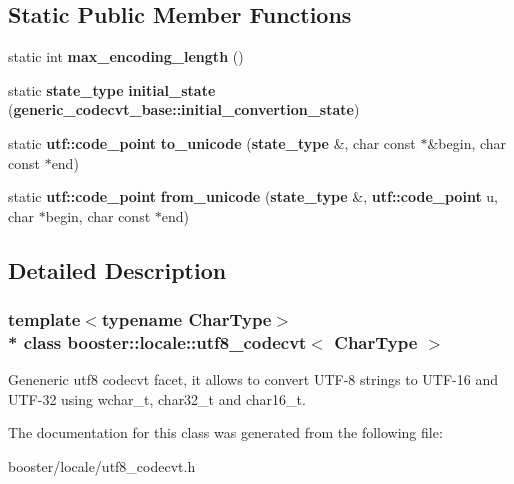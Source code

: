 \subsection*{Static Public Member Functions}
\begin{DoxyCompactItemize}
\item 
static int {\bfseries max\+\_\+encoding\+\_\+length} ()\label{classbooster_1_1locale_1_1utf8__codecvt_a4476be501469ebfecd9786b643e0598b}

\item 
static {\bf state\+\_\+type} {\bfseries initial\+\_\+state} ({\bf generic\+\_\+codecvt\+\_\+base\+::initial\+\_\+convertion\+\_\+state})\label{classbooster_1_1locale_1_1utf8__codecvt_a0a0ced9a5b661c48e8a0471a85596f59}

\item 
static {\bf utf\+::code\+\_\+point} {\bfseries to\+\_\+unicode} ({\bf state\+\_\+type} \&, char const $\ast$\&begin, char const $\ast$end)\label{classbooster_1_1locale_1_1utf8__codecvt_a7843e304f79a5d56a43fbdf05b720d8e}

\item 
static {\bf utf\+::code\+\_\+point} {\bfseries from\+\_\+unicode} ({\bf state\+\_\+type} \&, {\bf utf\+::code\+\_\+point} u, char $\ast$begin, char const $\ast$end)\label{classbooster_1_1locale_1_1utf8__codecvt_adf90e67eeef5be07bea87c6ad46d5559}

\end{DoxyCompactItemize}


\subsection{Detailed Description}
\subsubsection*{template$<$typename Char\+Type$>$\\*
class booster\+::locale\+::utf8\+\_\+codecvt$<$ Char\+Type $>$}

Geneneric utf8 codecvt facet, it allows to convert U\+T\+F-\/8 strings to U\+T\+F-\/16 and U\+T\+F-\/32 using wchar\+\_\+t, char32\+\_\+t and char16\+\_\+t. 

The documentation for this class was generated from the following file\+:\begin{DoxyCompactItemize}
\item 
booster/locale/utf8\+\_\+codecvt.\+h\end{DoxyCompactItemize}
